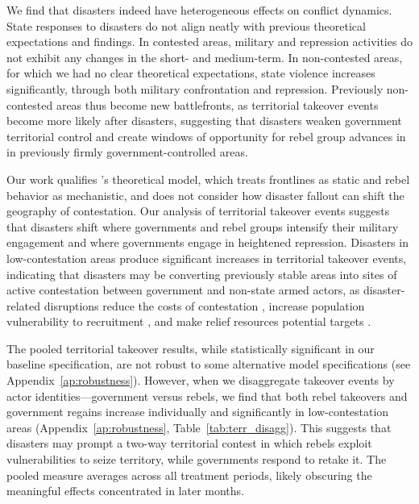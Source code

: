 \documentclass[bibtex]{article}
\begin{document}
{We find that disasters indeed have heterogeneous effects on conflict dynamics. State responses to disasters do not align neatly with previous theoretical expectations and findings. In contested areas, military and repression activities do not exhibit any changes in the short- and medium-term. In non-contested areas, for which we had no clear theoretical expectations, state violence increases significantly, through both military confrontation and repression. Previously non-contested areas thus become new battlefronts, as territorial takeover events become more likely after disasters, suggesting that disasters weaken government territorial control and create windows of opportunity for rebel group advances in in previously firmly government-controlled areas.  

Our work qualifies \citeauthor{sun2024strategic}'s \citeyearpar{sun2024strategic} theoretical model, which treats frontlines as static and rebel behavior as mechanistic, and does not consider how disaster fallout can shift the geography of contestation. Our analysis of territorial takeover events suggests that disasters shift where governments and rebel groups intensify their military engagement and where governments engage in heightened repression. Disasters in low-contestation areas produce significant increases in territorial takeover events, indicating that disasters may be converting previously stable areas into sites of active contestation between government and non-state armed actors, as disaster-related disruptions reduce the costs of contestation \citep{Eastin14032016}, increase population vulnerability to recruitment \citep{barnett2007climate}, and make relief resources potential targets \citep{ide2020multi, wood2016responding}.

{\color{black} The pooled territorial takeover results, while statistically significant in our baseline specification, are not robust to some alternative model specifications (see Appendix~\ref{ap:robustness}). However, when we disaggregate takeover events by actor identities---government versus rebels, we find that both rebel takeovers and government regains increase individually and significantly in low-contestation areas (Appendix~\ref{ap:robustness}, Table~\ref{tab:terr_disagg}). This suggests that disasters may prompt a two-way territorial contest in which rebels exploit vulnerabilities to seize territory, while governments respond to retake it. The pooled measure averages across all treatment periods, likely obscuring the meaningful effects concentrated in later months.}

}
\end{document}
